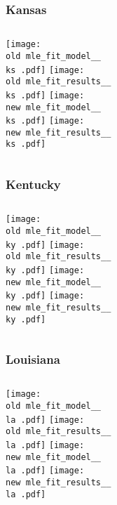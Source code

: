 \documentclass{beamer}
\newcommand{\old}{api-370-prod/pyseir/state_summaries/reports/}
\newcommand{\new}{new/pyseir/state_summaries/reports/}
\newcommand{\ks}{Kansas__20}
\newcommand{\ky}{Kentucky__21}
\newcommand{\la}{Louisiana__22}
\begin{document}
\begin{frame}
\frametitle{Kansas}
    \begin{columns}[t]

       \texttt{[image: \\old mle\_fit\_model\_\_\\ks .pdf]}
       \texttt{[image: \\old mle\_fit\_results\_\_\\ks .pdf]}   
       \texttt{[image: \\new mle\_fit\_model\_\_\\ks .pdf]}
       \texttt{[image: \\new mle\_fit\_results\_\_\\ks .pdf]}   
\end{columns}
\end{frame}

\begin{frame}
\frametitle{Kentucky}
    \begin{columns}[t]

       \texttt{[image: \\old mle\_fit\_model\_\_\\ky .pdf]}
       \texttt{[image: \\old mle\_fit\_results\_\_\\ky .pdf]}   
       \texttt{[image: \\new mle\_fit\_model\_\_\\ky .pdf]}
       \texttt{[image: \\new mle\_fit\_results\_\_\\ky .pdf]}   
\end{columns}
\end{frame}


\begin{frame}
\frametitle{Louisiana}
    \begin{columns}[t]

       \texttt{[image: \\old mle\_fit\_model\_\_\\la .pdf]}
       \texttt{[image: \\old mle\_fit\_results\_\_\\la .pdf]}   
       \texttt{[image: \\new mle\_fit\_model\_\_\\la .pdf]}
       \texttt{[image: \\new mle\_fit\_results\_\_\\la .pdf]}   
\end{columns}
\end{frame}
\end{document}
